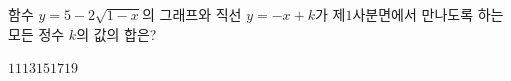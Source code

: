 함수 $y=5-2\sqrt{1-x}$의 그래프와 직선 $y=-x+k$가 \mbox{제$1$사분면에서} 만나도록 하는 모든 정수 $k$의 값의 합은?
\begin{choices32}{$11$}{$13$}{$15$}{$17$}{$19$}\end{choices32}
